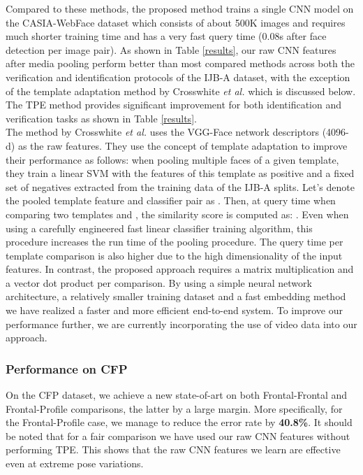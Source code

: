 \documentclass[10pt,twocolumn,letterpaper]{article}
\begin{document}
Compared to these methods, the proposed method trains a single CNN model on the
CASIA-WebFace dataset which consists of about 500K images and requires much
shorter training time and has a very fast query time (0.08s after face detection
per image pair). As shown in Table \ref{results}, our raw CNN features after media pooling perform better than most compared methods across both the  verification and identification protocols of the IJB-A dataset, with the exception of the template adaptation method by Crosswhite \emph{et al.} \cite{str-temp} which is discussed below. The TPE method provides significant improvement for both identification and verification tasks as shown in Table \ref{results}.\\

 The method by Crosswhite \emph{et al.} \cite{str-temp} uses the VGG-Face network \cite{parkhi15} descriptors (4096-d) as the raw features. They use the concept of template adaptation \cite{wolf} to improve their performance as follows: when pooling multiple faces of a given template, they train a linear SVM with the features of this template as positive and a
fixed set of negatives extracted from the training data of the IJB-A splits.
Let's denote the pooled template feature and classifier pair as . Then, at
query time when comparing two templates  and , the similarity 
score is computed as: . Even when using a carefully engineered fast linear classifier training
algorithm, this procedure increases the run time of the pooling procedure. The query time per template comparison is also higher due to the high dimensionality of the input features. In contrast, the proposed approach requires a matrix multiplication and a vector dot product per 
comparison. By using a simple neural network architecture, a relatively smaller
training dataset and a fast embedding method we have realized a faster and more efficient end-to-end system. To improve our performance further, we are currently incorporating the use of video data into our approach. 
  


\subsubsection*{Performance on CFP}
On the CFP dataset, we achieve a new state-of-art on both Frontal-Frontal and
Frontal-Profile comparisons, the latter by a large margin. More specifically,
for the Frontal-Profile case, we manage to reduce the error rate by
\textbf{40.8\%}. It should be noted that for a fair comparison we have used our
raw CNN features without performing TPE. This shows that the raw CNN features we
learn are effective even at extreme pose variations. 
\end{document}
